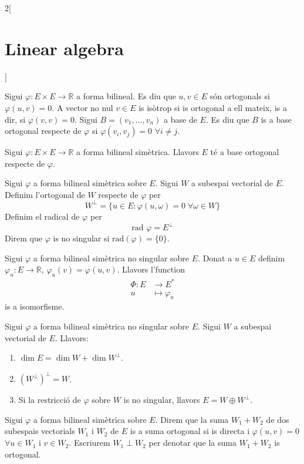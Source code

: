 \documentclass[../../../main.tex]{subfiles}
\begin{document}
\begin{multicols}{2}[\section{Linear algebra}]
\begin{prop}
\end{prop}
\begin{definition}
Sigui $\varphi:E\times E\rightarrow \mathbb{R}$ a forma bilineal. Es diu que $u,v\in E$ són ortogonals si $\varphi(u,v)=0$. A vector no nul $v\in E$ is isòtrop si is ortogonal a ell mateix, is a dir, si $\varphi(v,v)=0$. Sigui $B=(v_1,\ldots,v_n)$ a base de $E$. Es diu que $B$ is a base ortogonal respecte de $\varphi$ si $\varphi(v_i,v_j)=0$ $\forall i\ne j$.
\label{ALG-isotrop}
\end{definition}
\begin{theorem}
Sigui $\varphi:E\times E\rightarrow \mathbb{R}$ a forma bilineal simètrica. Llavors $E$ té a base ortogonal respecte de $\varphi$.
\end{theorem}
\begin{definition}
Sigui $\varphi$ a forma bilineal simètrica sobre $E$. Sigui $W$ a subespai vectorial de $E$. Definim l'ortogonal de $W$ respecte de $\varphi$ per $$W^\perp=\{u\in E:\varphi(u,\omega)=0\;\forall\omega\in W\}$$ Definim el radical de $\varphi$ per $$\text{rad }\varphi=E^\perp$$ Direm que $\varphi$ is no singular si $\text{rad}(\varphi)=\{0\}$.
\label{ALG-singular}
\end{definition}
\begin{definition}
Sigui $\varphi$ a forma bilineal simètrica no singular sobre $E$. Donat a $u\in E$ definim $\varphi_u:E\rightarrow\mathbb{R}$, $\varphi_u(v)=\varphi(u,v)$. Llavors l'function 
\begin{align*}
    \Phi: E&\rightarrow E^*\\
    u&\mapsto\varphi_u
\end{align*} is a isomorfisme. 
\end{definition}
\begin{definition}
Sigui $\varphi$ a forma bilineal simètrica no singular sobre $E$. Sigui $W$ a subespai vectorial de $E$. Llavors:
\begin{enumerate}
    \item $\dim E=\dim W+\dim W^\perp$.
    \item $(W^\perp)^\perp=W$.
    \item Si la restricció de $\varphi$ sobre $W$ is no singular, llavors $E=W\oplus W^\perp$.
\end{enumerate}
\end{definition}
\begin{definition}
Sigui $\varphi$ a forma bilineal simètrica sobre $E$. Direm que la suma $W_1+W_2$ de dos subespais vectorials $W_1$ i $W_2$ de $E$ is a suma ortogonal si is directa i $\varphi(u,v)=0$ $\forall u\in W_1$ i $v\in W_2$. Escriurem $W_1\perp W_2$ per denotar que la suma $W_1+W_2$ is ortogonal.

\end{definition}
\end{multicols}
\end{document}
